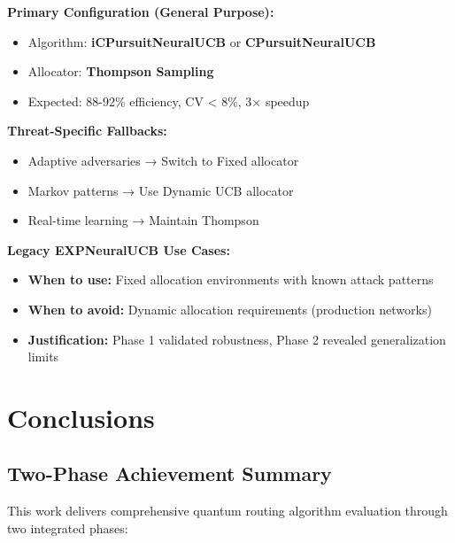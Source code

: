 \documentclass[11pt,a4paper]{article}
\newcommand{\success}[1]{\textcolor{successcolor}{\textbf{#1}}}
\begin{document}
\begin{tcolorbox}[colback=successcolor!10,colframe=successcolor,title=\textbf{Updated Deployment Recommendations}]

\textbf{Primary Configuration (General Purpose):}
\begin{itemize}
    \item Algorithm: \success{iCPursuitNeuralUCB} or \success{CPursuitNeuralUCB}
    \item Allocator: \success{Thompson Sampling}
    \item Expected: 88-92\% efficiency, CV < 8\%, 3× speedup
\end{itemize}

\textbf{Threat-Specific Fallbacks:}
\begin{itemize}
    \item Adaptive adversaries → Switch to Fixed allocator
    \item Markov patterns → Use Dynamic UCB allocator
    \item Real-time learning → Maintain Thompson
\end{itemize}

\textbf{Legacy EXPNeuralUCB Use Cases:}
\begin{itemize}
    \item \textbf{When to use:} Fixed allocation environments with known attack patterns
    \item \textbf{When to avoid:} Dynamic allocation requirements (production networks)
    \item \textbf{Justification:} Phase 1 validated robustness, Phase 2 revealed generalization limits
\end{itemize}

\end{tcolorbox}


\section{Conclusions}

\subsection{Two-Phase Achievement Summary}

This work delivers comprehensive quantum routing algorithm evaluation through two integrated phases:
\end{document}
